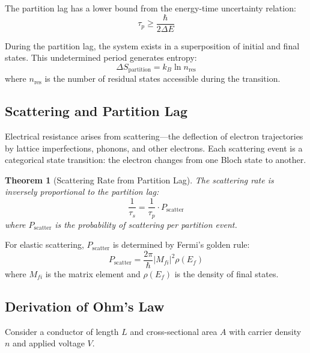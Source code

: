 \documentclass[twocolumn,showpacs,preprintnumbers,amsmath,amssymb,prd]{revtex4-2}
\newtheorem{theorem}{Theorem}[section]
\newcommand{\taup}{\tau_p}
\newcommand{\taus}{\tau_s}
\begin{document}
The partition lag has a lower bound from the energy-time uncertainty relation:
\begin{equation}
\taup \geq \frac{\hbar}{2\Delta E}
\label{eq:partition_lag_bound}
\end{equation}

During the partition lag, the system exists in a superposition of initial and final states. This undetermined period generates entropy:
\begin{equation}
\Delta S_{\text{partition}} = k_B \ln n_{\text{res}}
\label{eq:partition_entropy}
\end{equation}
where $n_{\text{res}}$ is the number of residual states accessible during the transition.

\subsection{Scattering and Partition Lag}

Electrical resistance arises from scattering---the deflection of electron trajectories by lattice imperfections, phonons, and other electrons. Each scattering event is a categorical state transition: the electron changes from one Bloch state to another.

\begin{theorem}[Scattering Rate from Partition Lag]
\label{thm:scattering_rate}
The scattering rate is inversely proportional to the partition lag:
\begin{equation}
\frac{1}{\taus} = \frac{1}{\taup} \cdot P_{\text{scatter}}
\label{eq:scattering_rate}
\end{equation}
where $P_{\text{scatter}}$ is the probability of scattering per partition event.
\end{theorem}

For elastic scattering, $P_{\text{scatter}}$ is determined by Fermi's golden rule:
\begin{equation}
P_{\text{scatter}} = \frac{2\pi}{\hbar} |M_{fi}|^2 \rho(E_f)
\label{eq:fermi_golden_rule}
\end{equation}
where $M_{fi}$ is the matrix element and $\rho(E_f)$ is the density of final states.

\subsection{Derivation of Ohm's Law}

Consider a conductor of length $L$ and cross-sectional area $A$ with carrier density $n$ and applied voltage $V$.
\end{document}
